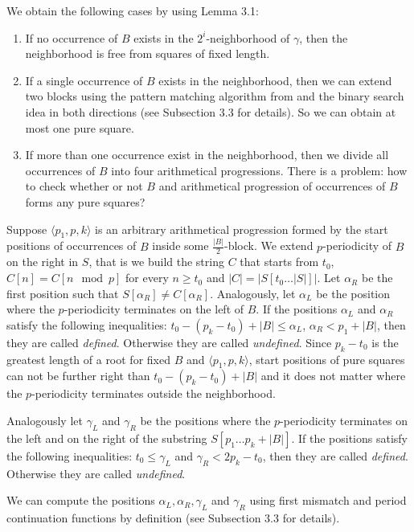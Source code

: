 \documentclass[11pt]{article}
\begin{document}
We obtain the following cases by using Lemma 3.1:

\begin{enumerate}
\item If no occurrence of $B$ exists in the $2^i$-neighborhood of
$\gamma$, then the neighborhood is free from squares of fixed
length.
\item If a single occurrence of $B$ exists in the neighborhood,
then we can extend two blocks using the pattern matching algorithm from \cite{15} and the binary search idea in
both directions (see Subsection 3.3 for details). So we can obtain at most one pure square.
\item If more than one occurrence exist in the neighborhood, then we divide all occurrences of $B$ into four
arithmetical progressions. There is a problem: how to check whether or not $B$ and arithmetical progression of
occurrences of $B$ forms any pure squares?
\end{enumerate}

\LocalSearchAreaIdea{}

Suppose $\langle p_1, p, k\rangle$ is an arbitrary arithmetical
progression formed by the start positions of occurrences of $B$
inside some $\frac{|B|}{2}$-block. We extend $p$-periodicity of
$B$ on the right in $S$, that is we build the string $C$ that
starts from $t_0$, $C[n] = C[n\mod p]$ for every $n \geq t_0$ and
$|C| = |S[t_0\dots|S|]|$. Let $\alpha_R$ be the first position
such that $S[\alpha_R] \neq C[\alpha_R]$. Analogously, let
$\alpha_L$ be the position where the $p$-periodicity terminates on
the left of $B$. If the positions $\alpha_L$ and $\alpha_R$
satisfy the following inequalities: $t_0 - (p_k - t_0) + |B| \leq
\alpha_L$, $\alpha_R < p_1 + |B|$, then they are called
\emph{defined}. Otherwise they are called \emph{undefined}. Since
$p_k - t_0$ is the greatest length of a root for fixed $B$ and
$\langle p_1, p, k\rangle$, start positions of pure squares can
not be further right than $t_0 - (p_k - t_0) + |B|$ and it does
not matter where the $p$-periodicity terminates outside the
neighborhood.

Analogously let $\gamma_L$ and $\gamma_R$ be the positions where
the $p$-periodicity terminates on the left and on the right of the
substring $S[p_1\dots p_k+|B|]$. If the positions satisfy the
following inequalities: $t_0 \leq \gamma_L$ and $\gamma_R < 2p_k -
t_0$, then they are called \emph{defined}. Otherwise they are
called \emph{undefined}.

We can compute the positions $\alpha_L, \alpha_R, \gamma_L$ and
$\gamma_R$ using first mismatch and period continuation functions
by definition (see Subsection 3.3 for details).
\end{document}
